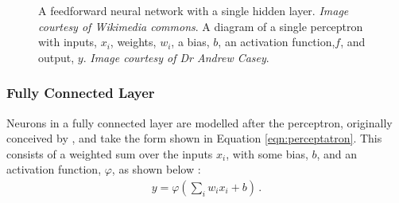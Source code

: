 \documentclass[11pt,a4paper,onecolumn]{report}
\begin{document}
  \begin{figure}[t]%
    \centering
    \qquad
    \caption[]{  A feedforward neural network with a single hidden layer.
      \textit{Image courtesy of Wikimedia commons\protect\footnotemark}.
       A diagram of a single perceptron with inputs,
      \(x_i\), weights, \(w_i\), a bias, \(b\), an activation function,\(f\),
      and output, \(y\). \textit{Image courtesy of Dr Andrew Casey}.}
  \end{figure}




\subsubsection{Fully Connected Layer}
Neurons in a fully connected layer are modelled after the perceptron, originally
conceived by \citet{rosenblatt1958}, and take the form shown in Equation
\ref{eqn:perceptatron}. This consists of a weighted sum over the inputs $x_i$,
with some bias, $b$, and an activation function, $\varphi$, as shown below
\citep{reagen2017}:
\begin{align}
  \label{eqn:perceptatron}
  y = \varphi \left(\sum_{i}{w_i x_i} + b \right)\,.
\end{align}
\\
\end{document}
